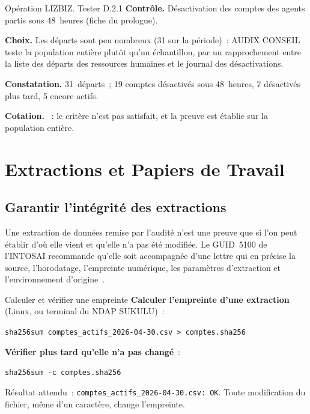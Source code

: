 \begin{boxscenario}{Opération LIZBIZ. Tester D.2.1}
\textbf{Contrôle.} Désactivation des comptes des agents partis sous
48~heures (fiche du prologue).

\medskip
\textbf{Choix.} Les départs sont peu nombreux (31 sur la période)~: AUDIX
CONSEIL teste la population entière plutôt qu'un échantillon, par un
rapprochement entre la liste des départs des ressources humaines et le
journal des désactivations.

\medskip
\textbf{Constatation.} 31~départs~; 19 comptes désactivés sous 48~heures,
7 désactivés plus tard, 5 encore actifs.

\medskip
\textbf{Cotation.} \NON{}~: le critère n'est pas satisfait, et la preuve est
établie sur la population entière.
\end{boxscenario}

\section{Extractions et Papiers de Travail}
\label{sec:c08-papiers}

\subsection{Garantir l'intégrité des extractions}

Une extraction de données remise par l'audité n'est une preuve que si l'on
peut établir d'où elle vient et qu'elle n'a pas été modifiée. Le GUID~5100
de l'INTOSAI recommande qu'elle soit accompagnée d'une lettre qui en
précise la source, l'horodatage, l'empreinte numérique, les paramètres
d'extraction et l'environnement d'origine~\cite{intosai2019guid5100}.

\begin{boxoutils}{Calculer et vérifier une empreinte}
\textbf{Calculer l'empreinte d'une extraction} (Linux, ou terminal du
NDAP SUKULU)~:

\texttt{sha256sum comptes\_actifs\_2026-04-30.csv > comptes.sha256}

\medskip
\textbf{Vérifier plus tard qu'elle n'a pas changé}~:

\texttt{sha256sum -c comptes.sha256}

\medskip
Résultat attendu~: \texttt{comptes\_actifs\_2026-04-30.csv: OK}. Toute
modification du fichier, même d'un caractère, change l'empreinte.
\end{boxoutils}

